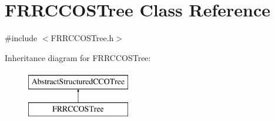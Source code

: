 \hypertarget{class_f_r_r_c_c_o_s_tree}{}\section{F\+R\+R\+C\+C\+O\+S\+Tree Class Reference}
\label{class_f_r_r_c_c_o_s_tree}


{\ttfamily \#include $<$F\+R\+R\+C\+C\+O\+S\+Tree.\+h$>$}

Inheritance diagram for F\+R\+R\+C\+C\+O\+S\+Tree\+:\begin{figure}[H]
\begin{center}
\leavevmode
\includegraphics[height=2.000000cm]{db/d75/class_f_r_r_c_c_o_s_tree}
\end{center}
\end{figure}
